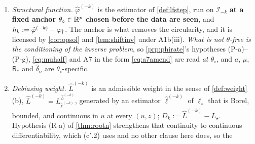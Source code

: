 \begin{definition}
\begin{enumerate}
\item[(b)] \emph{Structural function.} $\hat\varphi^{(-k)}$ is the estimator of \cref{def:lfstep}, run on
$\mathcal I_{-k}$ \textbf{at a fixed anchor $\theta_\circ\in\mathbb{R}^{p}$ chosen before the data are seen}, and
$h_k:=\hat\varphi^{(-k)}-\varphi_{\dagger}$. The anchor is what removes the circularity, and it is licensed by
\cref{cor:opsol} and \cref{lem:shiftinv} under A1b(iii). \emph{What is not $\theta$-free is the
conditioning of the inverse problem}, so \cref{prp:phirate}'s hypotheses (P-a)--(P-g), \eqref{eq:muhalf} and
A7 in the form \eqref{eq:a7amend} are read \emph{at $\theta_\circ$}, and $a$, $\mu$, $\mathsf R_\ast$ and
$\hat\delta_n$ are $\theta_\circ$-specific.
\item[(c)] \emph{Debiasing weight.} $\hat L^{(-k)}$ is an admissible weight in the sense of
\cref{def:weight}(b), $\hat L^{(-k)}=L^{\,\hat b^{(-k)}}_{\hat\ell^{(-k)}}$, generated by an estimator
$\hat\ell^{(-k)}$ of $\ell_\star$ that is Borel, bounded, and continuous in $u$ at every $(u,z)$;
$D_k:=\hat L^{(-k)}-L_\star$. Hypothesis (R-a) of \cref{thm:rootn} strengthens that continuity to
continuous differentiability, which \textup{(c$'$.2)} uses and no other clause here does, so the

\end{enumerate}
\end{definition}

